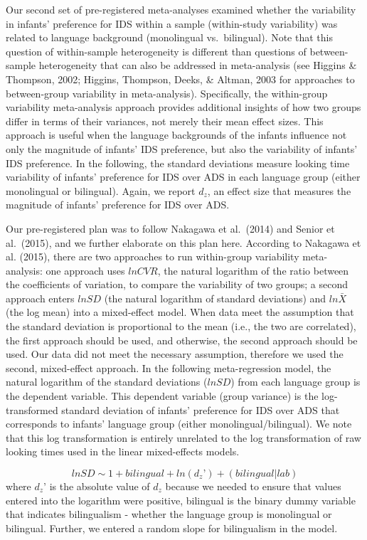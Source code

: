 \documentclass[,man,floatsintext]{apa6}
\begin{document}
Our second set of pre-registered meta-analyses examined whether the variability in infants' preference for IDS within a sample (within-study variability) was related to language background (monolingual vs.~bilingual). Note that this question of within-sample heterogeneity is different than questions of between-sample heterogeneity that can also be addressed in meta-analysis (see Higgins \& Thompson, 2002; Higgins, Thompson, Deeks, \& Altman, 2003 for approaches to between-group variability in meta-analysis). Specifically, the within-group variability meta-analysis approach provides additional insights of how two groups differ in terms of their variances, not merely their mean effect sizes. This approach is useful when the language backgrounds of the infants influence not only the magnitude of infants' IDS preference, but also the variability of infants' IDS preference. In the following, the standard deviations measure looking time variability of infants' preference for IDS over ADS in each language group (either monolingual or bilingual). Again, we report \(d_z\), an effect size that measures the magnitude of infants' preference for IDS over ADS.

Our pre-registered plan was to follow Nakagawa et al.~(2014) and Senior et al.~(2015), and we further elaborate on this plan here. According to Nakagawa et al. (2015), there are two approaches to run within-group variability meta-analysis: one approach uses \(lnCVR\), the natural logarithm of the ratio between the coefficients of variation, to compare the variability of two groups; a second approach enters \(lnSD\) (the natural logarithm of standard deviations) and \(ln\bar{X}\) (the log mean) into a mixed-effect model. When data meet the assumption that the standard deviation is proportional to the mean (i.e., the two are correlated), the first approach should be used, and otherwise, the second approach should be used. Our data did not meet the necessary assumption, therefore we used the second, mixed-effect approach. In the following meta-regression model, the natural logarithm of the standard deviations (\(lnSD\)) from each language group is the dependent variable. This dependent variable (group variance) is the log-transformed standard deviation of infants' preference for IDS over ADS that corresponds to infants' language group (either monolingual/bilingual). We note that this log transformation is entirely unrelated to the log transformation of raw looking times used in the linear mixed-effects models.

\[lnSD \sim 1 + bilingual + ln(d_z’) + (bilingual | lab)\]
where \(d_z’\) is the absolute value of \(d_z\) because we needed to ensure that values entered into the logarithm were positive, bilingual is the binary dummy variable that indicates bilingualism - whether the language group is monolingual or bilingual. Further, we entered a random slope for bilingualism in the model.
\end{document}
